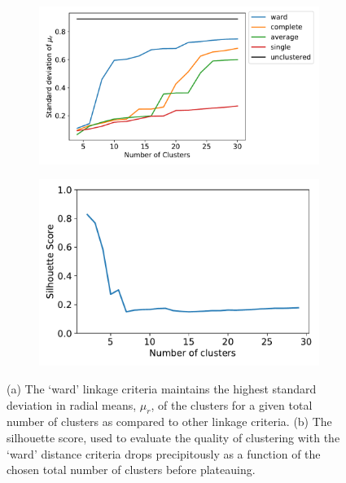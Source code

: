 \documentclass{article}
\begin{document}
  \begin{figure}
  \centering
  \begin{subfigure}{0.53\textwidth}
  \includegraphics[width=\textwidth]{rspread_nclusters.pdf}
  \caption{}\label{fig:rspread}
  \end{subfigure}
  \begin{subfigure}{0.45\textwidth}
  \includegraphics[width=\textwidth]{silhouette_MET.pdf}
  \caption{}\label{fig:silhouette_MET}
  \end{subfigure}
  \caption{(a) The `ward' linkage criteria maintains the highest standard 
  deviation in radial means, $\mu_r$, of the clusters for a given total 
  number of clusters as compared to other linkage criteria. (b) The 
  silhouette score, used to evaluate the quality of clustering with the 
  `ward' distance criteria drops precipitously as a function of the chosen
  total number of clusters before plateauing.}\label{fig:idk}
  \end{figure}
  
\end{document}
